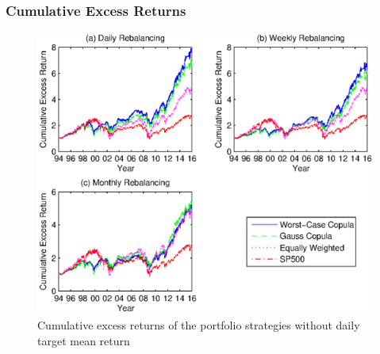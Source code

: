 \documentclass[pdf,10pt,xcolor=dvipsnames,hide notes]{beamer}
\begin{document}
%	
%		
%		
%		
%		
%		
%	

\begin{frame}[label=frame10]
\frametitle{Cumulative Excess Returns}

\begin{figure}[htbp]
\centering
\includegraphics[scale=0.58]{fig1_nogrid.eps}
\caption{\scriptsize Cumulative excess returns of the portfolio strategies without daily target mean return }
\label{fig:fig01}
\end{figure}

\end{frame}
\end{document}
